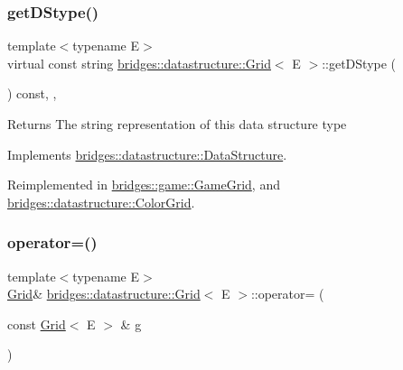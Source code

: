 \subsubsection{\texorpdfstring{getDStype()}{getDStype()}}
{\footnotesize\ttfamily template$<$typename E$>$ \\
virtual const string \mbox{\hyperlink{classbridges_1_1datastructure_1_1_grid}{bridges\+::datastructure\+::\+Grid}}$<$ E $>$\+::get\+D\+Stype (\begin{DoxyParamCaption}{ }\end{DoxyParamCaption}) const\hspace{0.3cm}{\ttfamily [inline]}, {\ttfamily [override]}, {\ttfamily [virtual]}}

\begin{DoxyReturn}{Returns}
The string representation of this data structure type 
\end{DoxyReturn}


Implements \mbox{\hyperlink{classbridges_1_1datastructure_1_1_data_structure_a4ff66cb34409f11fe9fc647f6d8a22ce}{bridges\+::datastructure\+::\+Data\+Structure}}.



Reimplemented in \mbox{\hyperlink{classbridges_1_1game_1_1_game_grid_a07da19700a077e3d0f2cde2cade2ba60}{bridges\+::game\+::\+Game\+Grid}}, and \mbox{\hyperlink{classbridges_1_1datastructure_1_1_color_grid_afad945d648b427ca183a1dface8249b7}{bridges\+::datastructure\+::\+Color\+Grid}}.

\mbox{\label{classbridges_1_1datastructure_1_1_grid_a3522d8c94ad390ebafb12257a6c9b82f}} 
\subsubsection{\texorpdfstring{operator=()}{operator=()}}
{\footnotesize\ttfamily template$<$typename E$>$ \\
\mbox{\hyperlink{classbridges_1_1datastructure_1_1_grid}{Grid}}\& \mbox{\hyperlink{classbridges_1_1datastructure_1_1_grid}{bridges\+::datastructure\+::\+Grid}}$<$ E $>$\+::operator= (\begin{DoxyParamCaption}\item[{const \mbox{\hyperlink{classbridges_1_1datastructure_1_1_grid}{Grid}}$<$ E $>$ \&}]{g }\end{DoxyParamCaption})\hspace{0.3cm}{\ttfamily [inline]}}

